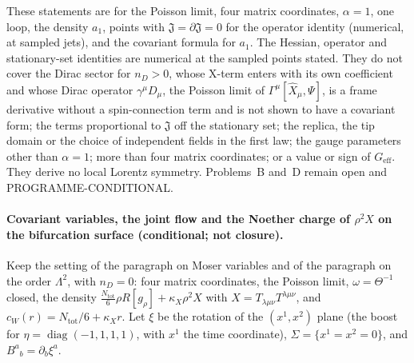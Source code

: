 These statements are for the Poisson limit, four matrix coordinates, \(\alpha=1\), one loop, the density \(a_1\), points with \(\mathfrak J=\partial\mathfrak J=0\) for the operator identity (numerical, at sampled jets), and the covariant formula for \(a_1\). The Hessian, operator and stationary-set identities are numerical at the sampled points stated. They do not cover the Dirac sector for \(n_D>0\), whose X-term enters with its own coefficient and whose Dirac operator \(\gamma^\mu D_\mu\), the Poisson limit of \(\Gamma^\mu[\hat X_\mu,\Psi]\), is a frame derivative without a spin-connection term and is not shown to have a covariant form; the terms proportional to \(\mathfrak J\) off the stationary set; the replica, the tip domain or the choice of independent fields in the first law; the gauge parameters other than \(\alpha=1\); more than four matrix coordinates; or a value or sign of \(G_{\mathrm{eff}}\). They derive no local Lorentz symmetry. Problems~B and~D remain open and PROGRAMME-CONDITIONAL.

\paragraph{Covariant variables, the joint flow and the Noether charge of \(\rho^2X\) on the bifurcation surface (conditional; not closure).}
Keep the setting of the paragraph on Moser variables and of the paragraph on the order \(\Lambda^2\), with \(n_D=0\): four matrix coordinates, the Poisson limit, \(\omega=\Theta^{-1}\) closed, the density \(\tfrac{N_{\mathrm{tot}}}6\rho R[g_\rho]+\kappa_X\rho^2X\) with \(X=T_{\lambda\mu\nu}T^{\lambda\mu\nu}\), and \(c_W(r)=N_{\mathrm{tot}}/6+\kappa_Xr\). Let \(\xi\) be the rotation of the \((x^1,x^2)\) plane (the boost for \(\eta=\operatorname{diag}(-1,1,1,1)\), with \(x^1\) the time coordinate), \(\Sigma=\{x^1=x^2=0\}\), and \(B^a{}_b=\partial_b\xi^a\).


